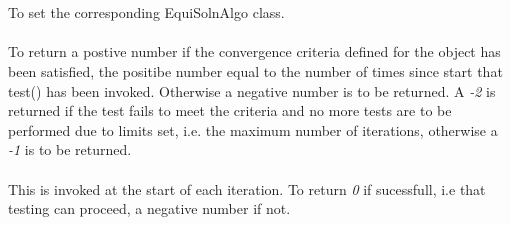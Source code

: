   \\
 \\
To set the corresponding EquiSolnAlgo class. \\

 \\
To return a postive number if the convergence criteria defined for the
object has been satisfied, the positibe number equal to the number of times 
since \p start that test() has been invoked. Otherwise a negative number 
is to be returned. A {\em -2} 
is returned if the test fails to meet the criteria and no more tests are to be 
performed due to limits set, i.e. the maximum number of iterations, otherwise a
{\em -1} is to be returned.  \\

 \\
This is invoked at the start of each iteration. To return {\em 0} if sucessfull, i.e 
that testing can proceed, a negative number if not. \\
